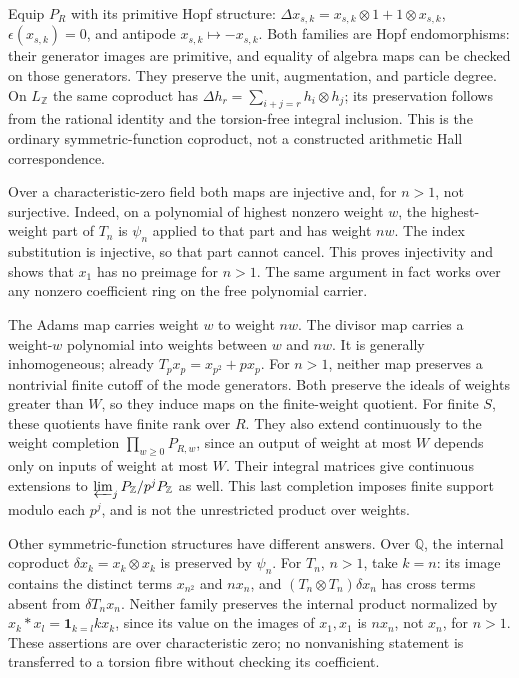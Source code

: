 Equip \(P_R\) with its primitive Hopf structure:
\(\Delta x_{s,k}=x_{s,k}\otimes1+1\otimes x_{s,k}\),
\(\epsilon(x_{s,k})=0\), and antipode \(x_{s,k}\mapsto-x_{s,k}\).
Both families are Hopf endomorphisms: their generator images are primitive,
and equality of algebra maps can be checked on those generators. They
preserve the unit, augmentation, and particle degree. On \(L_{\mathbb Z}\)
the same coproduct has
\(\Delta h_r=\sum_{i+j=r}h_i\otimes h_j\); its preservation follows
from the rational identity and the torsion-free integral inclusion.
This is the ordinary symmetric-function coproduct, not a constructed
arithmetic Hall correspondence.

Over a characteristic-zero field both maps are injective and, for
\(n>1\), not surjective. Indeed, on a polynomial of highest nonzero
weight \(w\), the highest-weight part of \(T_n\) is \(\psi_n\) applied
to that part and has weight \(nw\). The index substitution is injective,
so that part cannot cancel. This proves injectivity and shows that \(x_1\)
has no preimage for \(n>1\). The same argument in fact works over any
nonzero coefficient ring on the free polynomial carrier.

The Adams map carries weight \(w\) to weight \(nw\). The divisor map
carries a weight-\(w\) polynomial into weights between \(w\) and \(nw\).
It is generally inhomogeneous; already \(T_px_p=x_{p^2}+px_p\).
For \(n>1\), neither map preserves a nontrivial finite cutoff of the mode generators.
Both preserve the ideals of weights greater than \(W\), so they induce
maps on the finite-weight quotient. For finite \(S\), these quotients
have finite rank over \(R\). They also extend continuously to the weight
completion \(\prod_{w\ge0}P_{R,w}\), since an output of weight at most
\(W\) depends only on inputs of weight at most \(W\). Their integral
matrices give continuous extensions to
\(\varprojlim_j P_{\mathbb Z}/p^jP_{\mathbb Z}\) as well. This last
completion imposes finite support modulo each \(p^j\), and is not the
unrestricted product over weights.

Other symmetric-function structures have different answers. Over
\(\mathbb Q\), the internal coproduct \(\delta x_k=x_k\otimes x_k\)
is preserved by \(\psi_n\). For \(T_n\), \(n>1\), take \(k=n\):
its image contains the distinct terms \(x_{n^2}\) and \(n x_n\), and
\((T_n\otimes T_n)\delta x_n\) has cross terms absent from
\(\delta T_nx_n\). Neither family preserves the internal product
normalized by \(x_k*x_l=\mathbf1_{k=l}k x_k\), since its value on the
images of \(x_1,x_1\) is \(n x_n\), not \(x_n\), for \(n>1\).
These assertions are over characteristic zero; no nonvanishing statement
is transferred to a torsion fibre without checking its coefficient.

